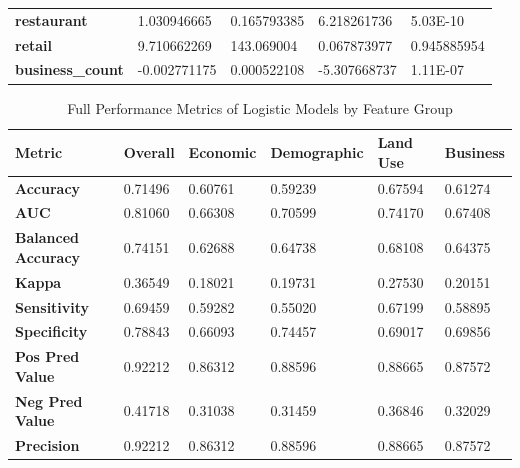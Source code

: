 \documentclass{article}
\begin{document}
\begin{table}[H]
\begin{center}
\begin{tabular}{@{}lllll@{}}
\textbf{restaurant}                          & 1.030946665       & 0.165793385         & 6.218261736      & 5.03E-10                       \\
\textbf{retail}                              & 9.710662269       & 143.069004          & 0.067873977      & 0.945885954                    \\
\textbf{business\_count}                     & -0.002771175      & 0.000522108         & -5.307668737     & 1.11E-07     \\\bottomrule
\end{tabular}
\end{center}
\end{table}

\begin{table}[H]
\begin{center}
\caption{\label{tab:f}Full Performance Metrics of Logistic Models by Feature Group}
\begin{tabular}{@{}llllll@{}}
\toprule
\textbf{Metric}               & \textbf{Overall} & \textbf{Economic} & \textbf{Demographic} & \textbf{Land Use} & \textbf{Business} \\ \midrule
\textbf{Accuracy}             & 0.71496          & 0.60761           & 0.59239              & 0.67594           & 0.61274           \\
\textbf{AUC}                  & 0.81060          & 0.66308           & 0.70599              & 0.74170           & 0.67408           \\
\textbf{Balanced Accuracy}    & 0.74151          & 0.62688           & 0.64738              & 0.68108           & 0.64375           \\
\textbf{Kappa}                & 0.36549          & 0.18021           & 0.19731              & 0.27530           & 0.20151           \\
\textbf{Sensitivity}          & 0.69459          & 0.59282           & 0.55020              & 0.67199           & 0.58895           \\
\textbf{Specificity}          & 0.78843          & 0.66093           & 0.74457              & 0.69017           & 0.69856           \\
\textbf{Pos Pred Value}       & 0.92212          & 0.86312           & 0.88596              & 0.88665           & 0.87572           \\
\textbf{Neg Pred Value}       & 0.41718          & 0.31038           & 0.31459              & 0.36846           & 0.32029           \\
\textbf{Precision}            & 0.92212          & 0.86312           & 0.88596              & 0.88665           & 0.87572           \\

\end{tabular}
\end{center}
\end{table}
\end{document}
